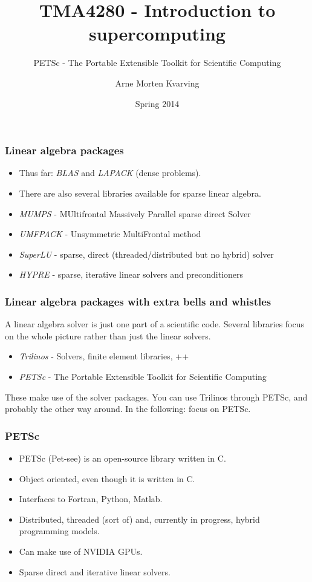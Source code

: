 \documentclass{beamer}
\title{TMA4280 - Introduction to supercomputing}
\subtitle{PETSc - The Portable Extensible Toolkit for Scientific Computing}
\author{Arne Morten Kvarving}
\institute{NTNU and SINTEF ICT}
\date{Spring 2014}
\begin{document}
\maketitle
\begin{frame}\frametitle{Linear algebra packages}
  \begin{itemize}
    \item Thus far: \emph{BLAS} and \emph{LAPACK} (dense problems).
    \item There are also several libraries available for sparse linear algebra.
    \item \emph{MUMPS} - MUltifrontal Massively Parallel sparse direct Solver
    \item \emph{UMFPACK} - Unsymmetric MultiFrontal method
    \item \emph{SuperLU} - sparse, direct (threaded/distributed but no hybrid) solver
    \item \emph{HYPRE} - sparse, iterative linear solvers and preconditioners
  \end{itemize}
\end{frame}

\begin{frame}\frametitle{Linear algebra packages with extra bells and whistles}
  A linear algebra solver is just one part of a scientific code. Several libraries
  focus on the whole picture rather than just the linear solvers.
  \begin{itemize}
    \item \emph{Trilinos} - Solvers, finite element libraries, ++
    \item \emph{PETSc} - The Portable Extensible Toolkit for Scientific Computing
  \end{itemize}
  These make use of the solver packages. You can use Trilinos through PETSc,
  and probably the other way around. In the following: focus on PETSc.
\end{frame}

\begin{frame}\frametitle{PETSc}
  \begin{itemize}
    \item PETSc (Pet-see) is an open-source library written in C.
    \item Object oriented, even though it is written in C.
    \item Interfaces to Fortran, Python, Matlab.
    \item Distributed, threaded (sort of) and, currently in progress, hybrid programming models.
    \item Can make use of NVIDIA GPUs.
    \item Sparse direct and iterative linear solvers.
  \end{itemize}
\end{frame}
\end{document}
